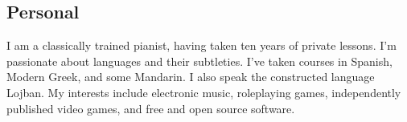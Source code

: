 \documentclass{article}
\begin{document}
\subsection*{Personal}

I am a classically trained pianist, having taken ten years of private lessons.
I'm passionate about languages and their subtleties. I've taken courses in
Spanish, Modern Greek, and some Mandarin. I also speak the constructed language
Lojban.
My interests include electronic music, roleplaying games, independently
published video games, and free and open source software.
\end{document}
